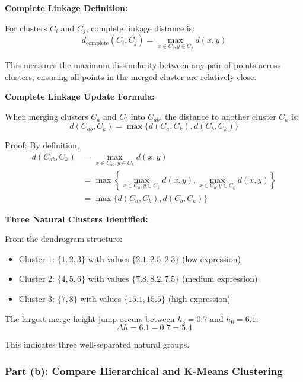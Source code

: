 \documentclass[12pt]{article}
\begin{document}
\begin{explanation}

\textbf{Complete Linkage Definition:}

For clusters $C_i$ and $C_j$, complete linkage distance is:
\[
d_{\text{complete}}(C_i, C_j) = \max_{x \in C_i, y \in C_j} d(x, y)
\]

This measures the maximum dissimilarity between any pair of points across clusters, ensuring all points in the merged cluster are relatively close.

\textbf{Complete Linkage Update Formula:}

When merging clusters $C_a$ and $C_b$ into $C_{ab}$, the distance to another cluster $C_k$ is:
\[
d(C_{ab}, C_k) = \max\{d(C_a, C_k), d(C_b, C_k)\}
\]

Proof: By definition,
\begin{align*}
d(C_{ab}, C_k) &= \max_{x \in C_{ab}, y \in C_k} d(x, y) \\
&= \max\left\{\max_{x \in C_a, y \in C_k} d(x, y), \max_{x \in C_b, y \in C_k} d(x, y)\right\} \\
&= \max\{d(C_a, C_k), d(C_b, C_k)\}
\end{align*}

\textbf{Three Natural Clusters Identified:}

From the dendrogram structure:
\begin{itemize}
    \item Cluster 1: $\{1, 2, 3\}$ with values $\{2.1, 2.5, 2.3\}$ (low expression)
    \item Cluster 2: $\{4, 5, 6\}$ with values $\{7.8, 8.2, 7.5\}$ (medium expression)
    \item Cluster 3: $\{7, 8\}$ with values $\{15.1, 15.5\}$ (high expression)
\end{itemize}

The largest merge height jump occurs between $h_5 = 0.7$ and $h_6 = 6.1$:
\[
\Delta h = 6.1 - 0.7 = 5.4
\]

This indicates three well-separated natural groups.

\end{explanation}

\subsubsection{Part (b): Compare Hierarchical and K-Means Clustering}
\end{document}
